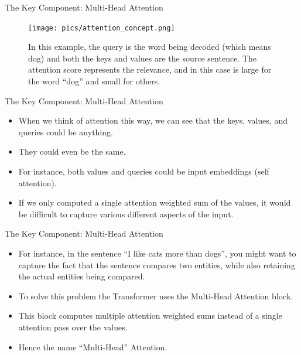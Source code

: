 \documentclass[handout]{beamer}
\begin{document}
\begin{frame}{The Key Component: Multi-Head Attention}

    \begin{figure}[h]
        	\texttt{[image: pics/attention\_concept.png]}
        	\caption{In this example, the query is the word being decoded (which means dog) and both the keys and values are the source sentence. The attention score represents the relevance, and in this case is large for the word “dog” and small for others.}
        \end{figure}  

\end{frame}




\begin{frame}{The Key Component: Multi-Head Attention}
\begin{scriptsize}
\begin{itemize}
 \item When we think of attention this way, we can see that the keys, values, and queries could be anything. 
 \item They could even be the same. 
 \item For instance, both values and queries could be input embeddings (self attention). 
 
 \item If we only computed a single attention weighted sum of the values, it would be difficult to capture various different aspects of the input.
 

\end{itemize}

\end{scriptsize}

\end{frame}



\begin{frame}{The Key Component: Multi-Head Attention}
\begin{scriptsize}
\begin{itemize}
 \item For instance, in the sentence ``I like cats more than dogs'', you might want to capture the fact that the sentence compares two entities, while also retaining the actual entities being compared. 
 
 \item To solve this problem the Transformer uses the Multi-Head Attention block. 
 
 \item This block computes multiple attention weighted sums instead of a single attention pass over the values.
 
 \item Hence the name ``Multi-Head'' Attention.
 
 
 
\end{itemize}

\end{scriptsize}

\end{frame}
\end{document}

